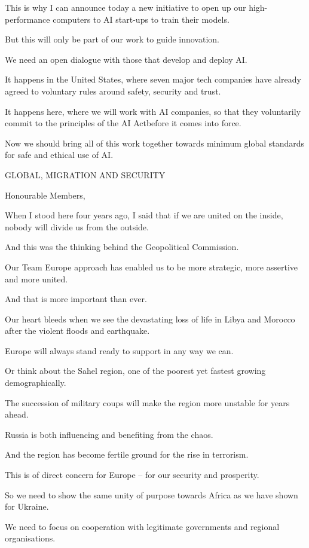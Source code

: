 \documentclass[a4paper,11pt]{article}
\begin{document}
This is why I can announce today a new initiative to open up our high-performance computers to AI start-ups to train their models.

But this will only be part of our work to guide innovation.

We need an open dialogue with those that develop and deploy AI. 

It happens in the United States, where seven major tech companies have already agreed to voluntary rules around safety, security and trust. 

It happens here, where we will work with AI companies, so that they voluntarily commit to the principles of the AI Actbefore it comes into force.

Now we should bring all of this work together towards minimum global standards for safe and ethical use of AI.

 

GLOBAL, MIGRATION AND SECURITY

Honourable Members,

When I stood here four years ago, I said that if we are united on the inside, nobody will divide us from the outside.

And this was the thinking behind the Geopolitical Commission.

Our Team Europe approach has enabled us to be more strategic, more assertive and more united.

And that is more important than ever.

Our heart bleeds when we see the devastating loss of life in Libya and Morocco after the violent floods and earthquake.

Europe will always stand ready to support in any way we can. 

Or think about the Sahel region, one of the poorest yet fastest growing demographically.

The succession of military coups will make the region more unstable for years ahead.

Russia is both influencing and benefiting from the chaos.

And the region has become fertile ground for the rise in terrorism. 

This is of direct concern for Europe – for our security and prosperity.

So we need to show the same unity of purpose towards Africa as we have shown for Ukraine. 

We need to focus on cooperation with legitimate governments and regional organisations.
\end{document}
